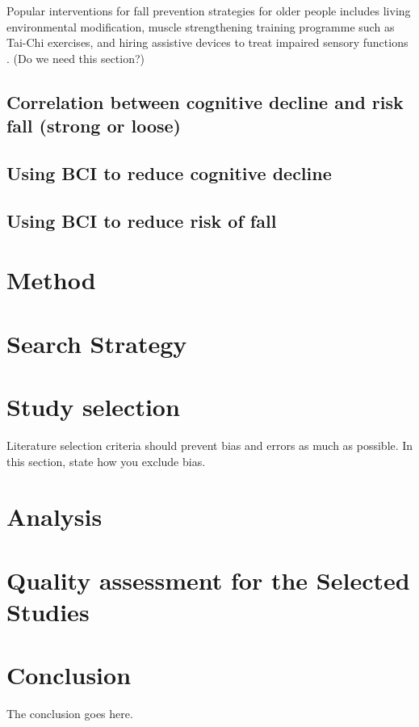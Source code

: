 \documentclass[conference,compsoc]{IEEEtran}
\begin{document}
Popular interventions for fall prevention strategies for older people includes living environmental modification, muscle strengthening training programme such as Tai-Chi exercises, and hiring assistive devices to treat impaired sensory functions \cite{who_2012}. (Do we need this section?)

\subsection{Correlation between cognitive decline and risk fall (strong or loose)}


\subsection{Using BCI to reduce cognitive decline}

\subsection{Using BCI to reduce risk of fall}

\section{Method}
\section{Search Strategy}
\section{Study selection}
Literature selection criteria should prevent bias and errors as much as possible. In this section, state how you exclude bias.
\section{Analysis}

\section{Quality assessment for the Selected Studies}





\section{Conclusion}
The conclusion goes here.
\end{document}

